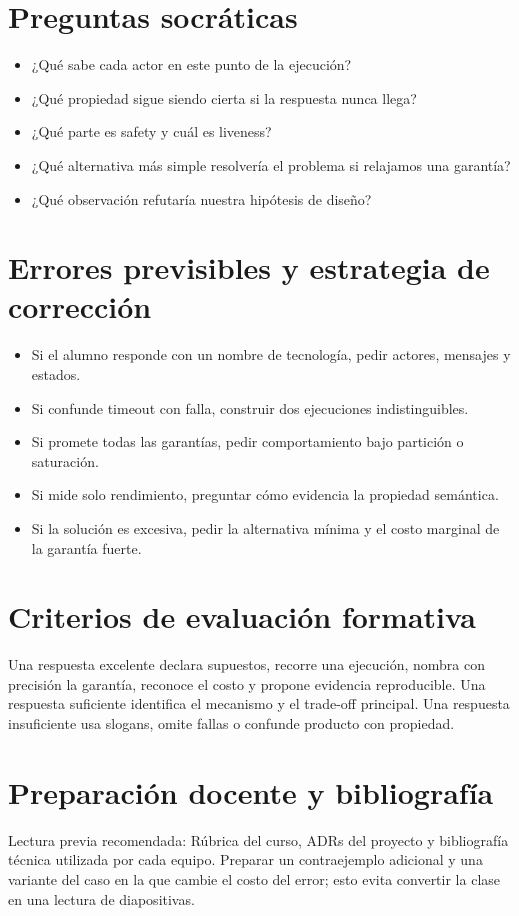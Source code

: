 \documentclass[variant=docente,cover=institutional,mode=screen]{ua-engineering-v6-article}
\begin{document}
\section{Preguntas socráticas}
\begin{itemize}
\item ¿Qué sabe cada actor en este punto de la ejecución?
\item ¿Qué propiedad sigue siendo cierta si la respuesta nunca llega?
\item ¿Qué parte es safety y cuál es liveness?
\item ¿Qué alternativa más simple resolvería el problema si relajamos una garantía?
\item ¿Qué observación refutaría nuestra hipótesis de diseño?
\end{itemize}

\section{Errores previsibles y estrategia de corrección}
\begin{itemize}
\item Si el alumno responde con un nombre de tecnología, pedir actores, mensajes y estados.
\item Si confunde timeout con falla, construir dos ejecuciones indistinguibles.
\item Si promete todas las garantías, pedir comportamiento bajo partición o saturación.
\item Si mide solo rendimiento, preguntar cómo evidencia la propiedad semántica.
\item Si la solución es excesiva, pedir la alternativa mínima y el costo marginal de la garantía fuerte.
\end{itemize}

\section{Criterios de evaluación formativa}
Una respuesta excelente declara supuestos, recorre una ejecución, nombra con precisión la garantía, reconoce el costo y propone evidencia reproducible. Una respuesta suficiente identifica el mecanismo y el trade-off principal. Una respuesta insuficiente usa slogans, omite fallas o confunde producto con propiedad.

\section{Preparación docente y bibliografía}
Lectura previa recomendada: Rúbrica del curso, ADRs del proyecto y bibliografía técnica utilizada por cada equipo. Preparar un contraejemplo adicional y una variante del caso en la que cambie el costo del error; esto evita convertir la clase en una lectura de diapositivas.
\end{document}
